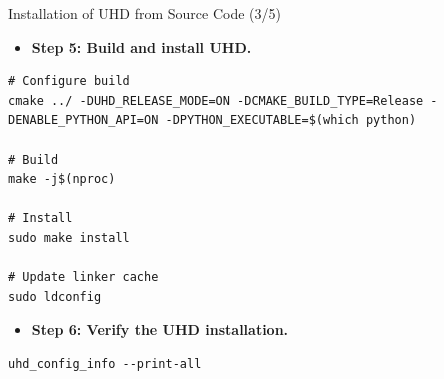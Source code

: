 \begin{frame}[fragile]{Installation of UHD from Source Code (3/5)}
\footnotesize

\begin{itemize}
    \item \textbf{Step 5: Build and install UHD.}
\end{itemize}

\scriptsize
\begin{Verbatim}[xleftmargin=3.8em,breaklines,breakanywhere,breaksymbolleft={},breaksymbolright={}]
# Configure build
cmake ../ -DUHD_RELEASE_MODE=ON -DCMAKE_BUILD_TYPE=Release -DENABLE_PYTHON_API=ON -DPYTHON_EXECUTABLE=$(which python)

# Build
make -j$(nproc)

# Install
sudo make install

# Update linker cache
sudo ldconfig
\end{Verbatim}
\vspace{0.5cm}
\begin{itemize}
    \item \textbf{Step 6: Verify the UHD installation.}
\end{itemize}

\scriptsize
\begin{Verbatim}[xleftmargin=3.8em,breaklines,breakanywhere,breaksymbolleft={},breaksymbolright={}]
uhd_config_info --print-all
\end{Verbatim}
\end{frame}